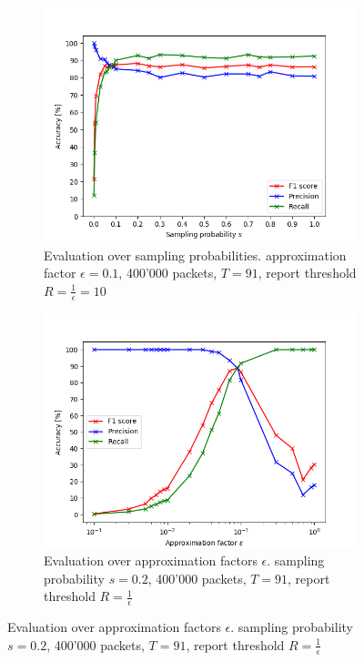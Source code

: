 \documentclass[11pt,oneside,a4paper]{article}
\begin{document}
\begin{figure}
	\centering
	\begin{subfigure}{.5\textwidth}
		\centering
		\includegraphics[width=\linewidth]{figures/sampl_prob_400k_e0_1_re}
		\caption{Evaluation over sampling probabilities. \newline 
			approximation factor $\epsilon = 0.1$, 400'000 packets, \newline
			 $T = 91$, report threshold $R = \frac{1}{\epsilon} = 10$}
		\label{fig:sampling_prob_graph}
	\end{subfigure}%
	\begin{subfigure}{.5\textwidth}
		\centering
		\includegraphics[width=\linewidth]{figures/epsilon_400k_s0_2_re}
		\caption{Evaluation over approximation factors $\epsilon$. \newline 
			sampling probability $s = 0.2$, 400'000 packets, \newline
			$T = 91$, report threshold $R = \frac{1}{\epsilon}$}
		\label{fig:epsilon_graph}
	\end{subfigure}
\end{figure}
\end{document}
